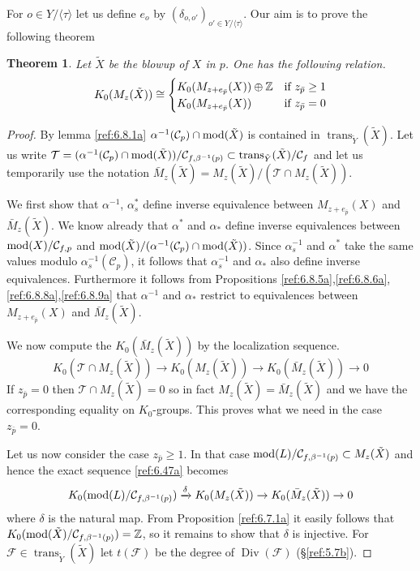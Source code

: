 \documentclass{amsproc}
\def \ZZ{{\mathbb Z}}
\def\Cscr{{\mathcal C}}
\def\Fscr{{\mathcal F}}
\def\Tscr{{\mathcal T}}
\def\mod{\mathop{\text{mod}}}
\def\trans{\operatorname{trans}}
\def\Div{\operatorname{Div}}
\def\r{\rightarrow}
\let\oldtext\text
\def\text#1{\oldtext{\upshape #1}}
\newtheorem{theorems}[lemmas]{Theorem}
\theoremstyle{definition}
\theoremstyle{remark}
\numberwithin{equation}{section}
\numberwithin{table}{section}
\numberwithin{figure}{section}
\begin{document}
For $o\in Y/\langle\tau \rangle$ let us define $e_o$ by
$(\delta_{o,o'})_{o'\in Y/\langle\tau\rangle}$. Our aim is to prove the
following theorem
\begin{theorems}
\label{ref:6.9.1a}
 Let $\tilde{X}$ be the blowup of $X$ in $p$.
One has the following relation.
\[
K_0(M_z(\tilde{X}))\cong
\begin{cases}
 K_0(M_{z+e_{\bar{p}}}(X))\oplus\ZZ &\text{if $z_{\bar{p}}\ge 1 $}\\
 K_0(M_{z+e_{\bar{p}}}(X))&\text{if $z_{\bar{p}}=0$}
\end{cases}
\]
\end{theorems}
\begin{proof}
  By lemma \ref{ref:6.8.1a} $\alpha^{-1}(\Cscr_p)\cap \mod(\tilde{X})$
  is contained in $\trans_{\tilde{Y}}(\tilde{X})$.  Let us write
  $\Tscr=(\alpha^{-1}(\Cscr_p)\cap
  \mod(\tilde{X}))/\Cscr_{f,\beta^{-1}(p)}\subset
  \trans_{\tilde{Y}}(\tilde{X})/\Cscr_f$ and let us temporarily use the
  notation ${\bar M}_z(\tilde{X})=M_z(\tilde{X})/ (\Tscr\cap
  M_z(\tilde{X}))$.

We first show that
$\alpha^{-1}$, $\alpha_s^\ast$ define inverse equivalence 
  between $M_{z+e_{\bar{p}}}(X)$ and ${\bar M}_z(\tilde{X})$.
  We know already that $\alpha^\ast$ and $\alpha_\ast$ define inverse
  equivalences between $\mod(X)/\Cscr_{f,p}$ and
  $\mod(\tilde{X})/(\alpha^{-1}(\Cscr_p)\cap\mod(\tilde{X}))$. Since
  $\alpha_s^{-1}$ and $\alpha^\ast$ take the same values modulo
  $\alpha_s^{-1}(\Cscr_p)$,  it follows that $\alpha_s^{-1}$ and
  $\alpha_\ast$ also define inverse equivalences. Furthermore it
  follows from Propositions
  \ref{ref:6.8.5a},\ref{ref:6.8.6a},\ref{ref:6.8.8a},\ref{ref:6.8.9a} that
  $\alpha^{-1}$ and $\alpha_\ast$ restrict to equivalences between
  $M_{z+e_{\bar{p}}}(X)$ and ${\bar M}_z(\tilde{X})$.

We now compute the $K_0(\bar{M}_z(\tilde{X}))$ by the localization
sequence. 
\begin{equation}
\label{ref:6.47a}
K_0(\Tscr\cap
  M_z(\tilde{X}))\r K_0(M_z(\tilde{X}))\r 
  K_0(\bar{M}_z(\tilde{X}))\r 0
\end{equation}
If $z_{\bar{p}}=0$ then $\Tscr\cap
  M_z(\tilde{X})=0$ so in fact $M_z(\tilde{X})=\bar{M}_z(\tilde{X})$
  and we have the corresponding equality on $K_0$-groups. This proves
  what we need in the case $z_{\bar{p}}=0$.

Let us now consider the case $z_{\bar{p}}\ge 1$. In that case
$\mod(L)/\Cscr_{f,\beta^{-1}(p)}\subset  M_z(\tilde{X})$ and hence the
exact sequence \eqref{ref:6.47a} becomes
\[
K_0(\mod(L)/\Cscr_{f,\beta^{-1}(p)})\xrightarrow{\delta} K_0(M_z(\tilde{X}))\r 
  K_0(\bar{M}_z(\tilde{X}))\r 0
\]
where $\delta$ is the natural map. From Proposition
\ref{ref:6.7.1a} it easily follows that
$K_0(\mod(\tilde{X})/\Cscr_{f,\beta^{-1}(p)})=\ZZ$, so it remains to
show that $\delta$ is injective.
For $\Fscr\in \trans_{\tilde{Y}}(\tilde{X})$ let $t(\Fscr)$ be the
  degree of $\Div(\Fscr)$ (\S \ref{ref:5.7b}).


\end{proof}
\end{document}
